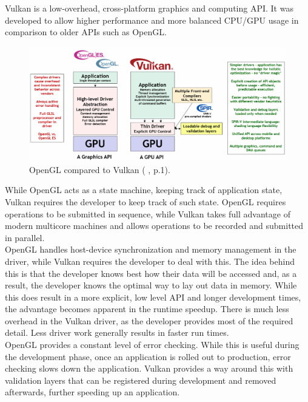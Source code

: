 \documentclass[12pt]{report}
\newcommand{\citediagram}[2]{(\citeauthor{#1} \citeyear{#1}, p.#2)}
\theoremstyle{definition}
\begin{document}
      Vulkan is a low-overhead, cross-platform graphics and computing API.
      It was developed to allow higher performance and more balanced CPU/GPU
      usage in comparison to older APIs such as OpenGL. \\

      \begin{figure}[h]
        \centering
        \includegraphics[width=\textwidth]{images/compare_opengl.png}
        \caption{OpenGL compared to Vulkan \citediagram{vulkan_guide}{1}.}
        \label{fig:compare_opengl}  
      \end{figure}

      While OpenGL acts as a state machine, keeping track of application state,
      Vulkan requires the developer to keep track of such state. OpenGL requires
      operations to be submitted in sequence, while Vulkan takes full advantage
      of modern multicore machines and allows operations to be recorded and
      submitted in parallel. \\

      OpenGL handles host-device synchronization and memory management in the
      driver, while Vulkan requires the developer to deal with this. The idea
      behind this is that the developer knows best how their data will be
      accessed and, as a result, the developer knows the optimal way to lay out
      data in memory. While this does result in a more explicit, low level API
      and longer development times, the advantage becomes apparent in the
      runtime speedup. There is much less overhead in the Vulkan driver, as the
      developer provides most of the required detail. Less driver work
      generally results in faster run times. \\

      OpenGL provides a constant level of error checking. While this is useful
      during the development phase, once an application is rolled out to
      production, error checking slows down the application. Vulkan provides
      a way around this with validation layers that can be registered during
      development and removed afterwards, further speeding up an application. \\
\end{document}
